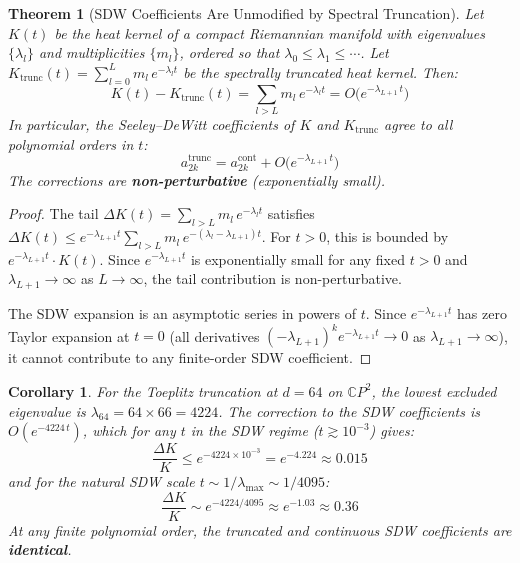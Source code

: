 \documentclass[12pt,a4paper]{article}
\newtheorem{theorem}{Theorem}
\newtheorem{corollary}{Corollary}
\begin{document}
\begin{theorem}[SDW Coefficients Are Unmodified by Spectral Truncation]
\label{thm:main}
Let $K(t)$ be the heat kernel of a compact Riemannian manifold with
eigenvalues $\{\lambda_l\}$ and multiplicities $\{m_l\}$, ordered so that
$\lambda_0 \leq \lambda_1 \leq \cdots$.  Let
$K_{\mathrm{trunc}}(t) = \sum_{l=0}^{L} m_l\, e^{-\lambda_l t}$
be the spectrally truncated heat kernel.  Then:
\begin{equation}
K(t) - K_{\mathrm{trunc}}(t) = \sum_{l > L} m_l \, e^{-\lambda_l t}
= O\bigl(e^{-\lambda_{L+1}\,t}\bigr)
\end{equation}
In particular, the Seeley--DeWitt coefficients of $K$ and $K_{\mathrm{trunc}}$
agree to all polynomial orders in $t$:
\begin{equation}
a_{2k}^{\mathrm{trunc}} = a_{2k}^{\mathrm{cont}} + O\bigl(e^{-\lambda_{L+1}\,t}\bigr)
\end{equation}
The corrections are \textbf{non-perturbative} (exponentially small).
\end{theorem}

\begin{proof}
The tail $\Delta K(t) = \sum_{l > L} m_l\, e^{-\lambda_l t}$ satisfies
$\Delta K(t) \leq e^{-\lambda_{L+1} t} \sum_{l > L} m_l\, e^{-(\lambda_l - \lambda_{L+1})t}$.
For $t > 0$, this is bounded by $e^{-\lambda_{L+1} t} \cdot K(t)$.
Since $e^{-\lambda_{L+1} t}$ is exponentially small for any fixed $t > 0$
and $\lambda_{L+1} \to \infty$ as $L \to \infty$, the tail contribution
is non-perturbative.

The SDW expansion is an asymptotic series in powers of $t$.  Since
$e^{-\lambda_{L+1} t}$ has zero Taylor expansion at $t = 0$ (all
derivatives $(-\lambda_{L+1})^k e^{-\lambda_{L+1} t} \to 0$ as
$\lambda_{L+1} \to \infty$), it cannot contribute to any finite-order
SDW coefficient.
\end{proof}

\begin{corollary}
For the Toeplitz truncation at $d = 64$ on $\mathbb{C}P^2$, the lowest
excluded eigenvalue is $\lambda_{64} = 64 \times 66 = 4224$.  The
correction to the SDW coefficients is $O(e^{-4224\,t})$, which for
any $t$ in the SDW regime ($t \gtrsim 10^{-3}$) gives:
\begin{equation}
\frac{\Delta K}{K} \leq e^{-4224 \times 10^{-3}} = e^{-4.224} \approx 0.015
\end{equation}
and for the natural SDW scale $t \sim 1/\lambda_{\max} \sim 1/4095$:
\begin{equation}
\frac{\Delta K}{K} \sim e^{-4224/4095} \approx e^{-1.03} \approx 0.36
\end{equation}
At any finite polynomial order, the truncated and continuous SDW
coefficients are \textbf{identical}.
\end{corollary}
\end{document}
